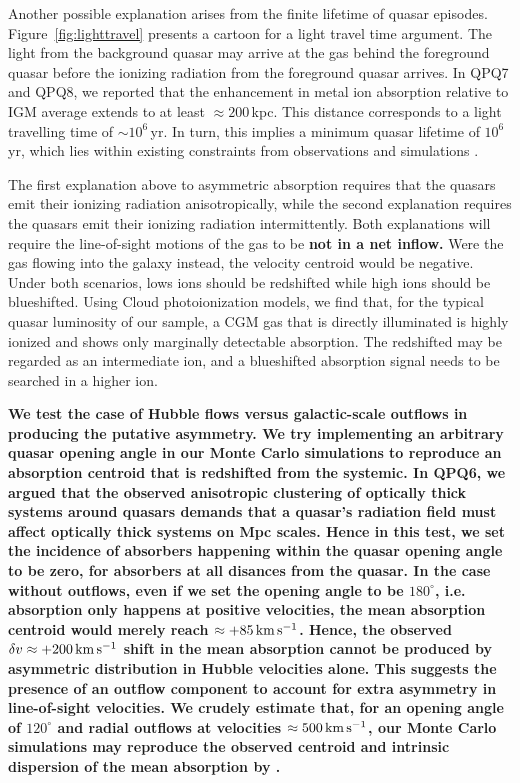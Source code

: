 \documentclass[iop]{emulateapj}
\begin{document}
Another possible explanation arises from the finite lifetime of quasar episodes.
Figure~\ref{fig:lighttravel} presents a cartoon for a light travel time argument. The light from
the background quasar may arrive at the gas behind
the foreground quasar before the ionizing radiation from the foreground quasar arrives. In
QPQ7 and QPQ8, we reported that the enhancement in metal ion absorption relative to IGM average
extends to at least $\approx200$\,kpc. This distance corresponds to a light travelling time of
$\sim10^6$\,yr.
In turn, this implies a minimum quasar lifetime of $10^6$\,yr, which lies within existing
constraints from
observations \citep[e.g.][]{Martini04} and simulations \citep[e.g.][]{Hopkins+05}.

The first explanation above to asymmetric
absorption requires that the quasars emit their ionizing radiation anisotropically, while the
second explanation requires the quasars emit their ionizing radiation intermittently. Both
explanations will require the line-of-sight motions of the gas to be {\bf not in a net inflow.}
Were the gas flowing into the galaxy instead, the velocity centroid would be negative.
Under both scenarios, lows ions should be redshifted while high ions should be blueshifted.
Using Cloud photoionization models, we find that, for the typical quasar luminosity of our sample,
a CGM gas that is directly illuminated is highly ionized and shows only marginally detectable
 absorption. The redshifted  may be regarded as an intermediate ion, and a
blueshifted absorption signal needs to be searched in a higher ion.

{\bf We test the case of Hubble flows versus galactic-scale outflows in producing the putative
asymmetry. We try implementing an arbitrary quasar opening angle in our Monte Carlo simulations to
reproduce an absorption centroid that is redshifted from the systemic. In QPQ6, we argued that
the observed anisotropic clustering of optically thick systems around quasars demands that a quasar's
radiation field must affect optically thick systems on Mpc scales. Hence in this test, we set the
incidence of absorbers happening within the quasar opening angle to be zero, for absorbers at all
disances from the quasar. In the case without
outflows, even if we set the opening angle to be $180^\circ$, i.e. absorption only happens at
positive velocities, the mean absorption centroid would merely reach $\approx+85\,{\rm km\,s^{-1}}$.
Hence, the observed $\delta v\approx+200\,{\rm km\,s^{-1}}$ shift in the mean absorption cannot be
produced by asymmetric distribution in Hubble velocities alone. This suggests the presence of an
outflow component to account for extra asymmetry in line-of-sight velocities.
We crudely estimate that, for an opening angle of $120^\circ$ and radial outflows at
velocities $\approx500\,{\rm km\,s^{-1}}$, our Monte Carlo simulations may reproduce the
observed centroid and intrinsic dispersion of the mean absorption by .}
\end{document}
